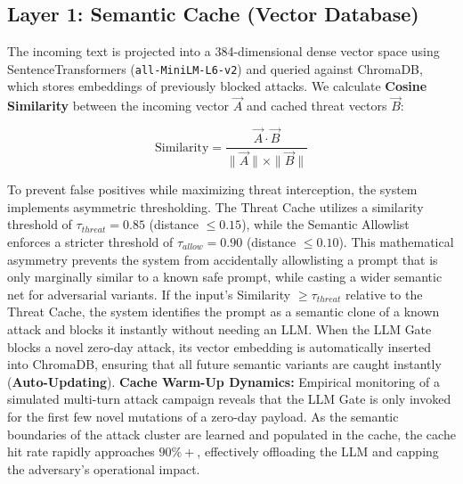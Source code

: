\documentclass[conference]{IEEEtran}
\begin{document}
\subsection{Layer 1: Semantic Cache (Vector Database)}
The incoming text is projected into a 384-dimensional dense vector space using SentenceTransformers (\texttt{all-MiniLM-L6-v2}) and queried against ChromaDB, which stores embeddings of previously blocked attacks. We calculate \textbf{Cosine Similarity} between the incoming vector $\vec{A}$ and cached threat vectors $\vec{B}$:

\begin{equation}
\text{Similarity} = \frac{\vec{A} \cdot \vec{B}}{\|\vec{A}\| \times \|\vec{B}\|}
\end{equation}

To prevent false positives while maximizing threat interception, the system implements asymmetric thresholding. The Threat Cache utilizes a similarity threshold of $\tau_{threat} = 0.85$ (distance $\leq 0.15$), while the Semantic Allowlist enforces a stricter threshold of $\tau_{allow} = 0.90$ (distance $\leq 0.10$). This mathematical asymmetry prevents the system from accidentally allowlisting a prompt that is only marginally similar to a known safe prompt, while casting a wider semantic net for adversarial variants. If the input's Similarity $\geq \tau_{threat}$ relative to the Threat Cache, the system identifies the prompt as a semantic clone of a known attack and blocks it instantly without needing an LLM. When the LLM Gate blocks a novel zero-day attack, its vector embedding is automatically inserted into ChromaDB, ensuring that all future semantic variants are caught instantly (\textbf{Auto-Updating}). \textbf{Cache Warm-Up Dynamics:} Empirical monitoring of a simulated multi-turn attack campaign reveals that the LLM Gate is only invoked for the first few novel mutations of a zero-day payload. As the semantic boundaries of the attack cluster are learned and populated in the cache, the cache hit rate rapidly approaches $90\%+$, effectively offloading the LLM and capping the adversary's operational impact.
\end{document}
